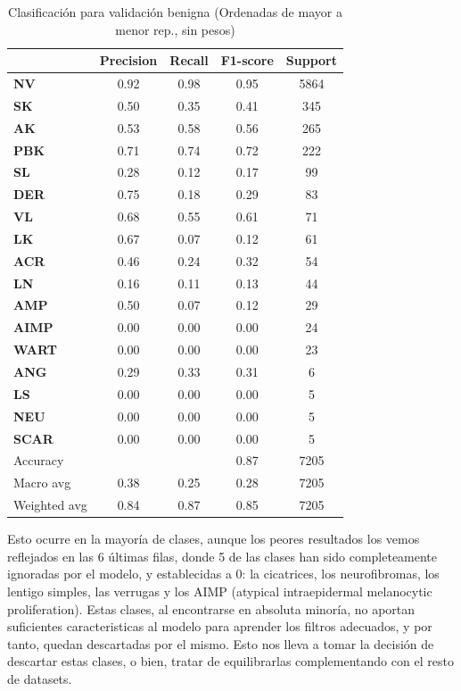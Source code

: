 \begin{table}[!ht]
	\centering
	\begin{tabular}{|l|c|c|c|c|}
		\hline
		& Precision & Recall & F1-score & Support \\
		\hline
		\textbf{NV} & 0.92 & 0.98 & 0.95 & 5864 \\ \hline
		\textbf{SK} & 0.50 & 0.35 & 0.41 & 345 \\ \hline
		\textbf{AK} & 0.53 & 0.58 & 0.56 & 265 \\ \hline
		\textbf{PBK} & 0.71 & 0.74 & 0.72 & 222 \\ \hline
		\textbf{SL} & 0.28 & 0.12 & 0.17 & 99 \\ \hline
		\textbf{DER} & 0.75 & 0.18 & 0.29 & 83 \\ \hline
		\textbf{VL} & 0.68 & 0.55 & 0.61 & 71 \\ \hline
		\textbf{LK} & 0.67 & 0.07 & 0.12 & 61 \\ \hline
		\textbf{ACR} & 0.46 & 0.24 & 0.32 & 54 \\ \hline
		\textbf{LN} & 0.16 & 0.11 & 0.13 & 44 \\ \hline
		\textbf{AMP} & 0.50 & 0.07 & 0.12 & 29 \\ \hline
		\textbf{AIMP} & 0.00 & 0.00 & 0.00 & 24 \\ \hline
		\textbf{WART} & 0.00 & 0.00 & 0.00 & 23 \\ \hline
		\textbf{ANG} & 0.29 & 0.33 & 0.31 & 6 \\ \hline
		\textbf{LS} & 0.00 & 0.00 & 0.00 & 5 \\ \hline
		\textbf{NEU} & 0.00 & 0.00 & 0.00 & 5 \\ \hline
		\textbf{SCAR} & 0.00 & 0.00 & 0.00 & 5 \\ \hline
		\hline
		Accuracy &  &  & 0.87 & 7205 \\
		Macro avg & 0.38& 0.25& 0.28&7205\\
		Weighted avg&0.84&0.87&0.85&7205\\
		\hline
	\end{tabular}
		\caption{Clasificación para validación benigna (Ordenadas de mayor a menor rep., sin pesos)}
	\label{tab:benignomalmetrics}
\end{table}

Esto ocurre en la mayoría de clases, aunque los peores resultados los vemos reflejados en las 6 últimas filas, donde 5 de las clases han sido completeamente ignoradas por el modelo, y establecidas a 0: la cicatrices, los neurofibromas, los lentigo simples, las verrugas y los AIMP (atypical intraepidermal melanocytic proliferation). Estas clases, al encontrarse en absoluta minoría, no aportan suficientes caracteristicas al modelo para aprender los filtros adecuados, y por tanto, quedan descartadas por el mismo. Esto nos lleva a tomar la decisión de descartar estas clases, o bien, tratar de equilibrarlas complementando con el resto de datasets.


